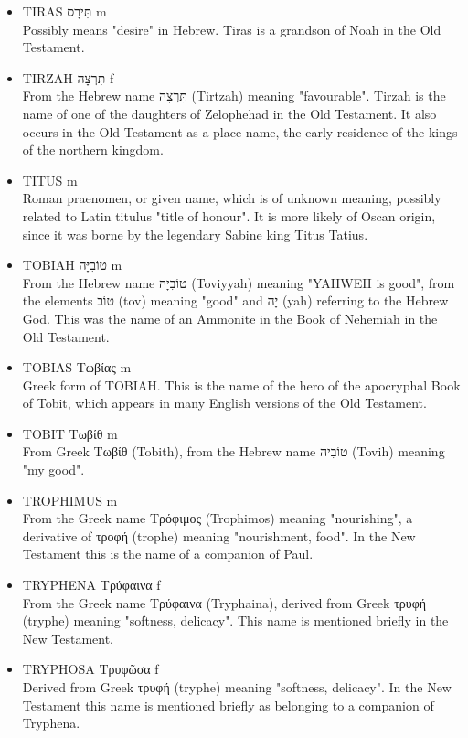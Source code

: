 \begin{itemize}
\item TIRAS תִּירָס m \\
Possibly means "desire" in Hebrew. Tiras is a grandson of Noah in the Old Testament.
\item TIRZAH תִּרְצָה f \\
From the Hebrew name תִּרְצָה (Tirtzah) meaning "favourable". Tirzah is the name of one of the daughters of Zelophehad in the Old Testament. It also occurs in the Old Testament as a place name, the early residence of the kings of the northern kingdom.
\item TITUS m\\
Roman praenomen, or given name, which is of unknown meaning, possibly related to Latin titulus "title of honour". It is more likely of Oscan origin, since it was borne by the legendary Sabine king Titus Tatius.
\item TOBIAH טוֹבִיָּה m \\
From the Hebrew name טוֹבִיָּה (Toviyyah) meaning "YAHWEH is good", from the elements טוֹב (tov) meaning "good" and יָה (yah) referring to the Hebrew God. This was the name of an Ammonite in the Book of Nehemiah in the Old Testament.
\item TOBIAS Τωβίας m \\
Greek form of TOBIAH. This is the name of the hero of the apocryphal Book of Tobit, which appears in many English versions of the Old Testament. 
\item TOBIT Τωβίθ m \\
From Greek Τωβίθ (Tobith), from the Hebrew name טוֹבִיה (Tovih) meaning "my good". 
\item TROPHIMUS m \\
From the Greek name Τρόφιμος (Trophimos) meaning "nourishing", a derivative of τροφή (trophe) meaning "nourishment, food". In the New Testament this is the name of a companion of Paul.
\item TRYPHENA Τρύφαινα f \\
From the Greek name Τρύφαινα (Tryphaina), derived from Greek τρυφή (tryphe) meaning "softness, delicacy". This name is mentioned briefly in the New Testament.
\item TRYPHOSA Τρυφῶσα f \\
Derived from Greek τρυφή (tryphe) meaning "softness, delicacy". In the New Testament this name is mentioned briefly as belonging to a companion of Tryphena.
\end{itemize}

